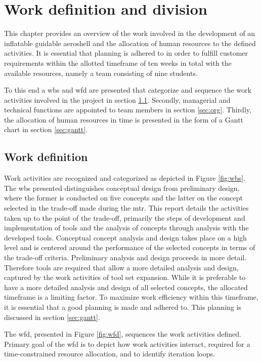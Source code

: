 \section{Work definition and division}
\label{ch:wdd}
This chapter provides an overview of the work involved in the development of an inflatable guidable aeroshell and the allocation of human resources to the defined activities. It is essential that planning is adhered to in order to fulfill customer requirements within the allotted timeframe of ten weeks in total with the available resources, namely a team consisting of nine students. 

To this end a \gls{wbs} and \gls{wfd} are presented that categorize and sequence the work activities involved in the project in section \ref{sec:work}. Secondly, managerial and technical functions are appointed to team members in section \ref{sec:org}. Thirdly, the allocation of human resources in time is presented in the form of a Gantt chart in section \ref{sec:gantt}.

\subsection{Work definition}
\label{sec:work}
Work activities are recognized and categorized as depicted in Figure  \ref{fig:wbs}. The \gls{wbs} presented distinguishes conceptual design from preliminary design, where the former is conducted on five concepts and the latter on the concept selected in the trade-off made during the \acrfull{mtr}. This report details the activities taken up to the point of the trade-off, primarily the steps of development and implementation of tools and the analysis of concepts through analysis with the developed tools. Conceptual concept analysis and design takes place on a high level and is centered around the performance of the selected concepts in terms of the trade-off criteria. Preliminary analysis and design proceeds in more detail. Therefore tools are required that allow a more detailed analysis and design, captured by the work activities of tool set expansion. While it is preferable to have a more detailed analysis and design of all selected concepts, the allocated timeframe is a limiting factor. To maximize work efficiency within this timeframe, it is essential that a good planning is made and adhered to. This planning is discussed in section \ref{sec:gantt}.

The \gls{wfd}, presented in Figure  \ref{fig:wfd}, sequences the work activities defined. Primary goal of the \gls{wfd} is to depict how work activities interact, required for a time-constrained resource allocation, and to identify iteration loops.

